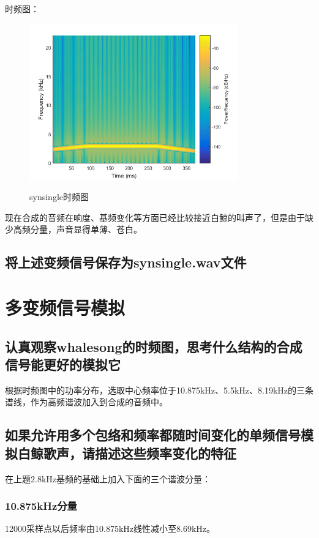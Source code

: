 \documentclass{article}
\begin{document}
            时频图：
            \begin{figure}[H]
                \centering
                \includegraphics[width=9cm]{figure9.png}
                \label{fig:synsingle-ft}\caption{synsingle时频图}
            \end{figure}

            现在合成的音频在响度、基频变化等方面已经比较接近白鲸的叫声了，但是由于缺少高频分量，声音显得单薄、苍白。

        \subsection{将上述变频信号保存为synsingle.wav文件}

    \section{多变频信号模拟}
        \subsection{认真观察whalesong的时频图，思考什么结构的合成信号能更好的模拟它}
            根据时频图中的功率分布，选取中心频率位于10.875kHz、5.5kHz、8.19kHz的三条谱线，作为高频谐波加入到合成的音频中。

        \subsection{如果允许用多个包络和频率都随时间变化的单频信号模拟白鲸歌声，请描述这些频率变化的特征}
            在上题2.8kHz基频的基础上加入下面的三个谐波分量：
            \subsubsection*{10.875kHz分量}
                12000采样点以后频率由10.875kHz线性减小至8.69kHz。
\end{document}
